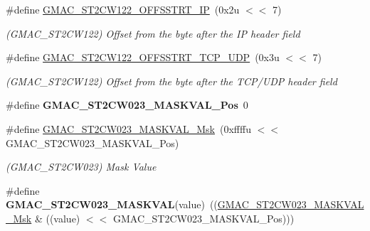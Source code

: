 \begin{DoxyCompactItemize}
\mbox{\label{group__SAMV71__GMAC_ga89415615cded93182ca4c0b963913697}} 
\#define \mbox{\hyperlink{group__SAMV71__GMAC_ga89415615cded93182ca4c0b963913697}{G\+M\+A\+C\+\_\+\+S\+T2\+C\+W122\+\_\+\+O\+F\+F\+S\+S\+T\+R\+T\+\_\+\+IP}}~(0x2u $<$$<$ 7)
\begin{DoxyCompactList}\small\item\em (G\+M\+A\+C\+\_\+\+S\+T2\+C\+W122) Offset from the byte after the IP header field \end{DoxyCompactList}\item 
\mbox{\label{group__SAMV71__GMAC_gae199f62001eca1a062c7879756aba16a}} 
\#define \mbox{\hyperlink{group__SAMV71__GMAC_gae199f62001eca1a062c7879756aba16a}{G\+M\+A\+C\+\_\+\+S\+T2\+C\+W122\+\_\+\+O\+F\+F\+S\+S\+T\+R\+T\+\_\+\+T\+C\+P\+\_\+\+U\+DP}}~(0x3u $<$$<$ 7)
\begin{DoxyCompactList}\small\item\em (G\+M\+A\+C\+\_\+\+S\+T2\+C\+W122) Offset from the byte after the T\+C\+P/\+U\+DP header field \end{DoxyCompactList}\item 
\mbox{\label{group__SAMV71__GMAC_gaf2f6ed618e4d9b91654ebd95e17af1bb}} 
\#define {\bfseries G\+M\+A\+C\+\_\+\+S\+T2\+C\+W023\+\_\+\+M\+A\+S\+K\+V\+A\+L\+\_\+\+Pos}~0
\item 
\mbox{\label{group__SAMV71__GMAC_ga5ac92cc2d99c164d104a7d96e1fb5f34}} 
\#define \mbox{\hyperlink{group__SAMV71__GMAC_ga5ac92cc2d99c164d104a7d96e1fb5f34}{G\+M\+A\+C\+\_\+\+S\+T2\+C\+W023\+\_\+\+M\+A\+S\+K\+V\+A\+L\+\_\+\+Msk}}~(0xffffu $<$$<$ G\+M\+A\+C\+\_\+\+S\+T2\+C\+W023\+\_\+\+M\+A\+S\+K\+V\+A\+L\+\_\+\+Pos)
\begin{DoxyCompactList}\small\item\em (G\+M\+A\+C\+\_\+\+S\+T2\+C\+W023) Mask Value \end{DoxyCompactList}\item 
\mbox{\label{group__SAMV71__GMAC_gabad882115fdb92ec4ef90ddd81281554}} 
\#define {\bfseries G\+M\+A\+C\+\_\+\+S\+T2\+C\+W023\+\_\+\+M\+A\+S\+K\+V\+AL}(value)~((\mbox{\hyperlink{group__SAMV71__GMAC_ga5ac92cc2d99c164d104a7d96e1fb5f34}{G\+M\+A\+C\+\_\+\+S\+T2\+C\+W023\+\_\+\+M\+A\+S\+K\+V\+A\+L\+\_\+\+Msk}} \& ((value) $<$$<$ G\+M\+A\+C\+\_\+\+S\+T2\+C\+W023\+\_\+\+M\+A\+S\+K\+V\+A\+L\+\_\+\+Pos)))

\end{DoxyCompactItemize}
